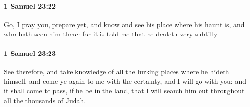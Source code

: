 		\paragraph{1 Samuel 23:22} %
			\label{1SAMUEL-23-22}

			Go, I pray you, prepare yet, and know and see his place where his haunt is, and who hath seen him there: for it is told me that he dealeth very subtilly.


		\paragraph{1 Samuel 23:23} %
			\label{1SAMUEL-23-23}

			See therefore, and take knowledge of all the lurking places where he hideth himself, and come ye again to me with the certainty, and I will go with you: and it shall come to pass, if he be in the land, that I will search him out throughout all the thousands of Judah.


